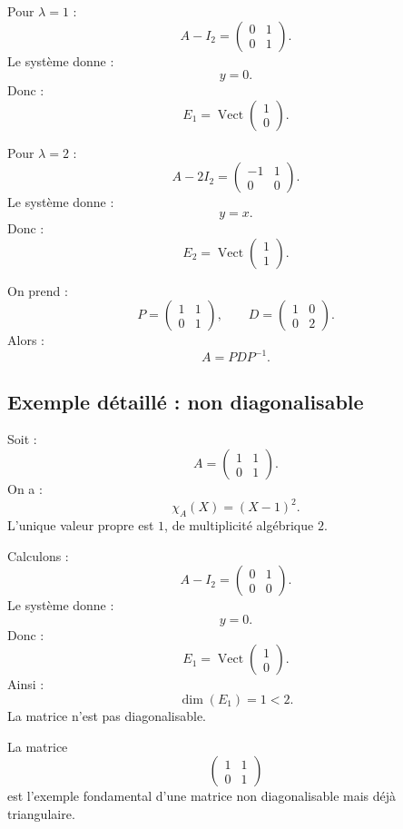 \documentclass[11pt,a4paper]{article}
\newcommand{\Vect}{\operatorname{Vect}}
\begin{document}
Pour \(\lambda=1\) :
\[
A-I_2=
\begin{pmatrix}
0&1\\
0&1
\end{pmatrix}.
\]
Le système donne :
\[
y=0.
\]
Donc :
\[
E_1=\Vect
\begin{pmatrix}
1\\0
\end{pmatrix}.
\]

Pour \(\lambda=2\) :
\[
A-2I_2=
\begin{pmatrix}
-1&1\\
0&0
\end{pmatrix}.
\]
Le système donne :
\[
y=x.
\]
Donc :
\[
E_2=\Vect
\begin{pmatrix}
1\\1
\end{pmatrix}.
\]

On prend :
\[
P=
\begin{pmatrix}
1&1\\
0&1
\end{pmatrix},
\qquad
D=
\begin{pmatrix}
1&0\\
0&2
\end{pmatrix}.
\]
Alors :
\[
A=PDP^{-1}.
\]

\subsection{Exemple détaillé : non diagonalisable}

Soit :
\[
A=
\begin{pmatrix}
1&1\\
0&1
\end{pmatrix}.
\]
On a :
\[
\chi_A(X)=(X-1)^2.
\]
L'unique valeur propre est \(1\), de multiplicité algébrique \(2\).

Calculons :
\[
A-I_2=
\begin{pmatrix}
0&1\\
0&0
\end{pmatrix}.
\]
Le système donne :
\[
y=0.
\]
Donc :
\[
E_1=
\Vect
\begin{pmatrix}
1\\0
\end{pmatrix}.
\]
Ainsi :
\[
\dim(E_1)=1<2.
\]
La matrice n'est pas diagonalisable.

\begin{retenirbox}
La matrice
\[
\begin{pmatrix}
1&1\\
0&1
\end{pmatrix}
\]
est l'exemple fondamental d'une matrice non diagonalisable mais déjà triangulaire.
\end{retenirbox}
\end{document}
